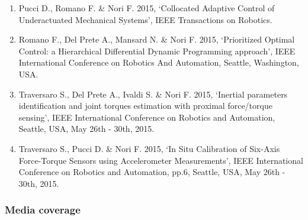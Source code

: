 \begin{enumerate}
\item Pucci D., Romano F. \& Nori F. 2015, ‘Collocated Adaptive Control of Underactuated Mechanical Systems’, IEEE Transactions on Robotics.

\item Romano F., Del Prete A., Mansard N. \& Nori F. 2015, ‘Prioritized Optimal Control: a Hierarchical Differential Dynamic Programming approach’, IEEE International Conference on Robotics And Automation, Seattle, Washington, USA.

\item Traversaro S., Del Prete A., Ivaldi S. \& Nori F. 2015, ‘Inertial parameters identification and joint torques estimation with proximal force/torque sensing’, IEEE International Conference on Robotics and Automation, Seattle, USA, May 26th - 30th, 2015.

\item Traversaro S., Pucci D. \& Nori F. 2015, ‘In Situ Calibration of Six-Axis Force-Torque Sensors using Accelerometer Measurements’, IEEE International Conference on Robotics and Automation, pp.6,  Seattle, USA, May 26th - 30th, 2015.
\end{enumerate}
	
\subsubsection{Media coverage}

